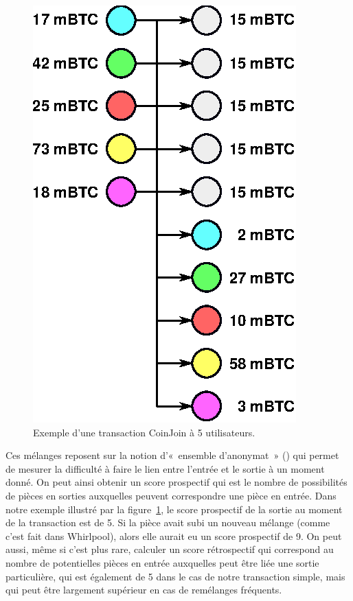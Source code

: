 \begin{figure}[ht]
  \centering
  \includegraphics[scale=0.85]{img/coinjoin-transaction-5i-10o.eps}
  \caption{Exemple d'une transaction CoinJoin à 5 utilisateurs.}
  \label{fig:coinjoin-transaction}
\end{figure}

Ces mélanges reposent sur la notion d'«~ensemble d'anonymat~» () qui permet de mesurer la difficulté à faire le lien entre l'entrée et le sortie à un moment donné. On peut ainsi obtenir un score prospectif qui est le nombre de possibilités de pièces en sorties auxquelles peuvent correspondre une pièce en entrée. Dans notre exemple illustré par la figure~\ref{fig:coinjoin-transaction}, le score prospectif de la sortie au moment de la transaction est de 5. Si la pièce avait subi un nouveau mélange (comme c'est fait dans Whirlpool), alors elle aurait eu un score prospectif de 9. On peut aussi, même si c'est plus rare, calculer un score rétrospectif qui correspond au nombre de potentielles pièces en entrée auxquelles peut être liée une sortie particulière, qui est également de 5 dans le cas de notre transaction simple, mais qui peut être largement supérieur en cas de remélanges fréquents. 

